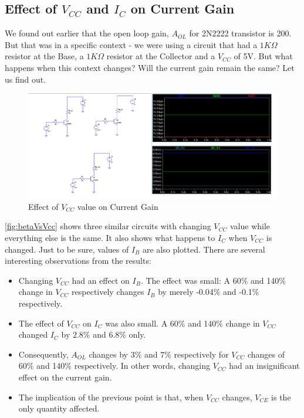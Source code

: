 \subsection{Effect of $V_{CC}$ and $I_C$ on Current Gain}
We found out earlier that the open loop gain, $A_{OL}$ for 2N2222 transistor is 200. But that was in a specific context - we were using a circuit that had a $1K\Omega$ resistor at the Base, a $1K\Omega$ resistor at the Collector and a $V_{CC}$ of 5V. But what happens when this context changes? Will the current gain remain the same? Let us find out. 

	\begin{figure}[h!]
	\centering
	\includegraphics[width = \textwidth]{partHW/betaVsVcc}
	\caption{Effect of $V_{CC}$ value on Current Gain}
	\label{fig:betaVsVcc}
	\end{figure}

\autoref{fig:betaVsVcc} shows three similar circuits with changing $V_{CC}$ value while everything else is the same. It also shows what happens to $I_C$ when $V_{CC}$ is changed. Just to be sure, values of $I_B$ are also plotted. There are several interesting observations from the results:
	\begin{itemize}
	\item Changing $V_{CC}$ had an effect on $I_B$. The effect was small: A 60\% and 140\% change in $V_{CC}$ respectively changes $I_B$ by merely -0.04\% and -0.1\% respectively. 
	\item The effect of $V_{CC}$ on $I_C$ was also small. A 60\% and 140\% change in $V_{CC}$ changed $I_C$ by 2.8\% and 6.8\% only.
	\item Consequently, $A_{OL}$ changes by 3\% and 7\% respectively for $V_{CC}$ changes of  60\% and 140\%  respectively. In other words, changing $V_{CC}$ had an insignificant  effect on the current gain.
	\item The implication of the previous point is that, when $V_{CC}$ changes, $V_{CE}$ is the only quantity affected. 
	\end{itemize}

